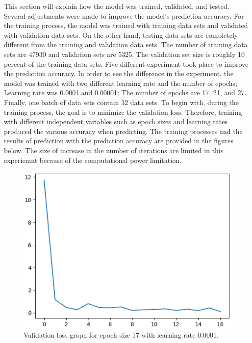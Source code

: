 This section will explain how the model was trained, validated, and tested. Several adjustments were
made to improve the model's prediction accuracy. For the training process, the model was trained with
training data sets and validated with validation data sets. On the other hand, testing data sets are
completely different from the training and validation data sets.
The number of training data sets are 47930 and validation sets are 5325. The validation set size is
roughly 10 percent of the training data sets. Five different experiment took place to improve the
prediction accuracy. In order to see the difference in the experiment, the model was trained with two
different learning rate and the number of epochs; Learning rate was 0.0001 and 0.00001; The number of
epochs are 17, 21, and 27. Finally, one batch of data sets contain 32 data sets.
\newline
\newline
\indent
To begin with, during the training process, the goal is to minimize the validation loss. Therefore,
training with different independent variables such as epoch sizes and learning rates produced the various
accuracy when predicting. The training processes and the results of prediction with the prediction accuracy are
provided in the figures below. The size of increase in the number of iterations are limited in this experiemnt
because of the computational power limitation.
    \begin{figure}
        \includegraphics[width=\textwidth, scale=0.25]{4_25000.eps}
        \caption{Validation loss graph for epoch size 17 with learning rate 0.0001.} \label{Figure2}
    \end{figure}

